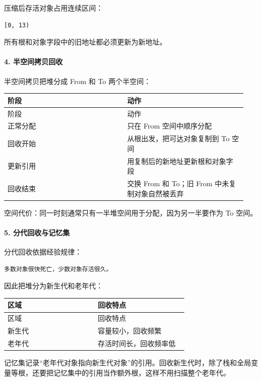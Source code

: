 \documentclass[UTF8]{ctexart}
\begin{document}
压缩后存活对象占用连续区间：

\begin{Verbatim}[fontsize=\small,breaklines=true]
[0, 13)
\end{Verbatim}

所有根和对象字段中的旧地址都必须更新为新地址。

\paragraph*{4. 半空间拷贝回收}

半空间拷贝把堆分成 From 和 To 两个半空间：

\begin{longtable}{|p{0.47\linewidth}|p{0.47\linewidth}|}
\hline
阶段 & 动作 \\
\hline
\endfirsthead
阶段 & 动作 \\
\hline
\endhead
正常分配 & 只在 From 空间中顺序分配 \\
\hline
回收开始 & 从根出发，把可达对象复制到 To 空间 \\
\hline
更新引用 & 用复制后的新地址更新根和对象字段 \\
\hline
回收结束 & 交换 From 和 To；旧 From 中未复制对象自然被丢弃 \\
\hline
\end{longtable}

空间代价：同一时刻通常只有一半堆空间用于分配，因为另一半要作为 To 空间。

\paragraph*{5. 分代回收与记忆集}

分代回收依据经验规律：

\begin{Verbatim}[fontsize=\small,breaklines=true]
多数对象很快死亡，少数对象存活很久。
\end{Verbatim}

因此把堆分为新生代和老年代：

\begin{longtable}{|p{0.47\linewidth}|p{0.47\linewidth}|}
\hline
区域 & 回收特点 \\
\hline
\endfirsthead
区域 & 回收特点 \\
\hline
\endhead
新生代 & 容量较小，回收频繁 \\
\hline
老年代 & 存活时间长，回收频率低 \\
\hline
\end{longtable}

记忆集记录“老年代对象指向新生代对象”的引用。回收新生代时，除了栈和全局变量等根，还要把记忆集中的引用当作额外根，这样不用扫描整个老年代。
\end{document}
